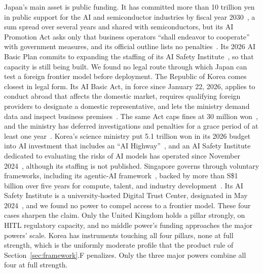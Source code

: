 \documentclass{ieeeaccess}
\begin{document}
Japan's main asset is public funding. It has committed more than 10 trillion yen in public support for the AI and semiconductor industries by fiscal year 2030~\cite{japan2024kantei10tn}, a sum spread over several years and shared with semiconductors, but its AI Promotion Act asks only that business operators ``shall endeavor to cooperate'' with government measures, and its official outline lists no penalties~\cite{japan2025aipromotionact}. Its 2026 AI Basic Plan commits to expanding the staffing of its AI Safety Institute~\cite{japan2026aibasicplan}, so that capacity is still being built. We found no legal route through which Japan can test a foreign frontier model before deployment. The Republic of Korea comes closest in legal form. Its AI Basic Act, in force since January 22, 2026, applies to conduct abroad that affects the domestic market, requires qualifying foreign providers to designate a domestic representative, and lets the ministry demand data and inspect business premises~\cite{korea2025aibasicact}. The same Act caps fines at 30 million won~\cite{korea2025aibasicact}, and the ministry has deferred investigations and penalties for a grace period of at least one year~\cite{korea2026msitaiact}. Korea's science ministry put 5.1 trillion won in its 2026 budget into AI investment that includes an ``AI Highway''~\cite{korea2025msitbudget}, and an AI Safety Institute dedicated to evaluating the risks of AI models has operated since November 2024~\cite{koreaaisi2024}, although its staffing is not published. Singapore governs through voluntary frameworks, including its agentic-AI framework~\cite{imda2026agentic}, backed by more than S\$1 billion over five years for compute, talent, and industry development~\cite{singapore2024nais}. Its AI Safety Institute is a university-hosted Digital Trust Center, designated in May 2024~\cite{singapore2024dtcaisi}, and we found no power to compel access to a frontier model. These four cases sharpen the claim. Only the United Kingdom holds a pillar strongly, on HITL regulatory capacity, and no middle power's funding approaches the major powers' scale. Korea has instruments touching all four pillars, none at full strength, which is the uniformly moderate profile that the product rule of Section~\ref{sec:framework}.F penalizes. Only the three major powers combine all four at full strength.
\end{document}
